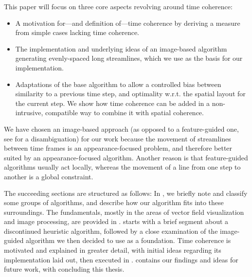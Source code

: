 This paper will focus on three core aspects revolving around time coherence:
\begin{itemize}
    \item A motivation for---and definition of---time coherence by deriving
    a measure from simple cases lacking time coherence.
    \item The implementation and underlying ideas of an image-based algorithm generating
    evenly-spaced long streamlines, which we use as the basis for our implementation.
    \item Adaptations of the base algorithm to allow a controlled bias between similarity
    to a previous time step, and optimality w.r.t. the spatial layout for the current step.
    We show how time coherence can be added in a non-intrusive,
    compatible way to combine it with spatial coherence.
\end{itemize}
We have chosen an image-based approach
(as opposed to a feature-guided one, see  for a disambiguation) for our work
because the movement of streamlines between time frames is an appearance-focused problem,
and therefore better suited by an appearance-focused algorithm.
Another reason is that feature-guided algorithms usually act locally,
whereas the movement of a line from one step to another is a global constraint.

The succeeding sections are structured as follows:
In , we briefly note and classify some groups of algorithms,
and describe how our algorithm fits into these surroundings.
The fundamentals, mostly in the areas of vector field visualization and image processing, are
provided in .
 starts with a brief segment about a discontinued heuristic algorithm,
followed by a close examination of the image-guided algorithm we then decided to use as a foundation.
Time coherence is motivated and explained in greater detail,
with initial ideas regarding its implementation laid out, then executed in .
 contains our findings and ideas for future work,
with  concluding this thesis.


